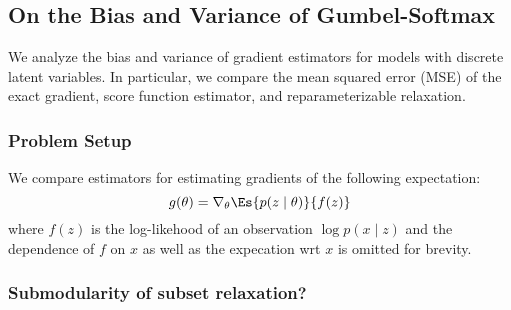\subsection{On the Bias and Variance of Gumbel-Softmax}

We analyze the bias and variance of gradient estimators for models with
discrete latent variables.
In particular, we compare the mean squared error (MSE) of the exact gradient,
score function estimator, and reparameterizable relaxation.

\subsubsection{Problem Setup}
We compare estimators for estimating gradients of the following expectation:
\begin{equation}
g(\theta) = \nabla_\theta \Es{p(z \mid\theta)}{f(z)}
\end{equation}
where $f(z)$ is the log-likehood of an observation $\log p(x \mid z)$
and the dependence of $f$ on $x$ as well as the expecation wrt $x$ is omitted for brevity.

\subsubsection{}

\subsubsection{Submodularity of subset relaxation?}
